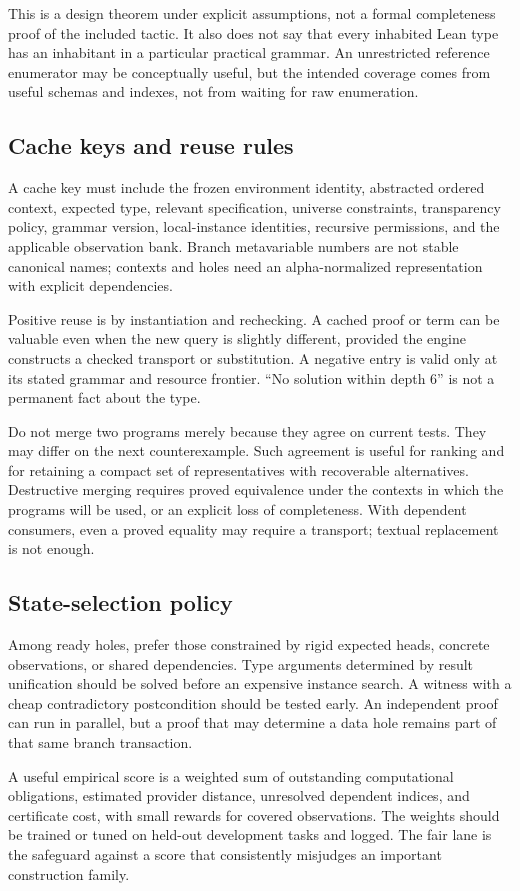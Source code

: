 This is a design theorem under explicit assumptions, not a formal completeness proof of the included tactic. It also does not say that every inhabited Lean type has an inhabitant in a particular practical grammar. An unrestricted reference enumerator may be conceptually useful, but the intended coverage comes from useful schemas and indexes, not from waiting for raw enumeration.

\subsection{Cache keys and reuse rules}

A cache key must include the frozen environment identity, abstracted ordered context, expected type, relevant specification, universe constraints, transparency policy, grammar version, local-instance identities, recursive permissions, and the applicable observation bank. Branch metavariable numbers are not stable canonical names; contexts and holes need an alpha-normalized representation with explicit dependencies.

Positive reuse is by instantiation and rechecking. A cached proof or term can be valuable even when the new query is slightly different, provided the engine constructs a checked transport or substitution. A negative entry is valid only at its stated grammar and resource frontier. ``No solution within depth 6'' is not a permanent fact about the type.

Do not merge two programs merely because they agree on current tests. They may differ on the next counterexample. Such agreement is useful for ranking and for retaining a compact set of representatives with recoverable alternatives. Destructive merging requires proved equivalence under the contexts in which the programs will be used, or an explicit loss of completeness. With dependent consumers, even a proved equality may require a transport; textual replacement is not enough.

\subsection{State-selection policy}

Among ready holes, prefer those constrained by rigid expected heads, concrete observations, or shared dependencies. Type arguments determined by result unification should be solved before an expensive instance search. A witness with a cheap contradictory postcondition should be tested early. An independent proof can run in parallel, but a proof that may determine a data hole remains part of that same branch transaction.

A useful empirical score is a weighted sum of outstanding computational obligations, estimated provider distance, unresolved dependent indices, and certificate cost, with small rewards for covered observations. The weights should be trained or tuned on held-out development tasks and logged. The fair lane is the safeguard against a score that consistently misjudges an important construction family.
